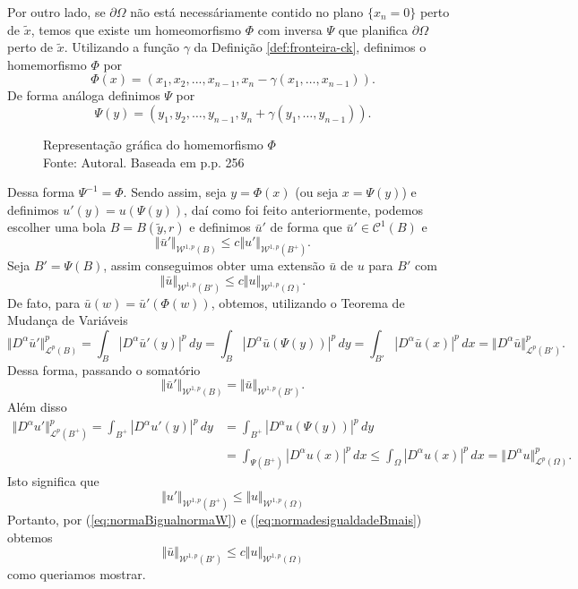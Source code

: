\documentclass[a4paper, 11pt]{book}
\theoremstyle{definition}
\newcommand{\cC}{\mathcal{C}}
\newcommand{\cL}{\mathcal{L}}
\newcommand{\cW}{\mathcal{W}}
\begin{document}
\begin{prf}
    Por outro lado, se $\partial\Omega$ não está necessáriamente contido no plano $\{x_n = 0\}$ perto de $\tilde x$, temos que existe um homeomorfismo $\Phi$ com inversa $\Psi$ que planifica $\partial \Omega$ perto de $\tilde x$. Utilizando a função $\gamma$ da Definição \ref{def:fronteira-ck}, definimos o homemorfismo $\Phi$ por
    \[
        \Phi(x) = (x_1,x_2,...,x_{n-1}, x_n - \gamma(x_1,\dots,x_{n-1})).
    \]
    De forma análoga definimos $\Psi$ por
    \[
        \Psi(y) = (y_1,y_2,\dots,y_{n-1},y_n + \gamma(y_1,\dots,y_{n-1})).
    \]
    \begin{figure}
        \centering
        
        \caption{Representação gráfica do homemorfismo $\Phi$\\Fonte: Autoral. Baseada em \cite{evans-pde} p.p. 256}
    \end{figure}
    Dessa forma $\Psi^{-1} = \Phi$. Sendo assim, seja $y = \Phi(x)$ (ou seja $x = \Psi(y)$) e definimos $u'(y) = u(\Psi(y))$, daí como foi feito anteriormente, podemos escolher uma bola $B = B(\tilde y, r)$ e definimos $\bar u'$ de forma que $\bar u' \in \cC^1(B)$ e
    \begin{equation}
        \Vert \bar u' \Vert_{\cW^{1,p}(B)} \leqslant c \Vert u' \Vert_{\cW^{1,p}(B^+)}.
    \end{equation}
    Seja $B' = \Psi(B)$, assim conseguimos obter uma extensão $\bar u$ de $u$ para $B'$ com
    \[
        \Vert \bar u \Vert_{\cW^{1,p}(B')} \leqslant c \Vert u \Vert_{\cW^{1,p}(\Omega)}.
    \]
    De fato, para $\bar u (w) = \bar u'(\Phi(w))$, obtemos, utilizando o Teorema de Mudança de Variáveis
    \[
        \Vert D^\alpha \bar u' \Vert_{\cL^p(B)}^p = \int_B |D^\alpha \bar u'(y)|^p \,dy = \int_B |D^\alpha \bar u (\Psi (y))|^p \,dy = \int_{B'} |D^\alpha \bar u (x)|^p \,dx = \Vert D^\alpha \bar u \Vert_{\cL^p(B')}^p.
    \]
    Dessa forma, passando o somatório
    \begin{equation} \label{eq:normaBigualnormaW}
        \Vert \bar u' \Vert_{\cW^{1,p}(B)} = \Vert  \bar u \Vert_{\cW^{1,p}(B')}.
    \end{equation}
    Além disso
    \[
        \begin{aligned}
            \Vert D^\alpha u' \Vert_{\cL^p(B^+)}^p = \int_{B^+} |D^\alpha u'(y) |^p \,dy &= \int_{B^+} |D^\alpha u (\Psi(y))|^p \,dy\\ &= \int_{\Psi(B^+)} |D^\alpha u(x)|^p \,dx \leqslant \int_{\Omega} |D^\alpha u(x)|^p \,dx = \Vert D^\alpha u \Vert_{\cL^p(\Omega)}^p.
        \end{aligned}
    \]
    Isto significa que
    \begin{equation} \label{eq:normadesigualdadeBmais}
        \Vert u' \Vert_{\cW^{1,p}(B^+)} \leqslant \Vert u \Vert_{\cW^{1,p}(\Omega)}
    \end{equation}
    Portanto, por (\ref{eq:normaBigualnormaW}) e (\ref{eq:normadesigualdadeBmais}) obtemos
    \begin{equation} \label{eq:desigualdadeWO}
        \Vert \bar u \Vert_{\cW^{1,p}(B')} \leqslant c \Vert u \Vert_{\cW^{1,p}(\Omega)}
    \end{equation}
    como queriamos mostrar.


\end{prf}
\end{document}
